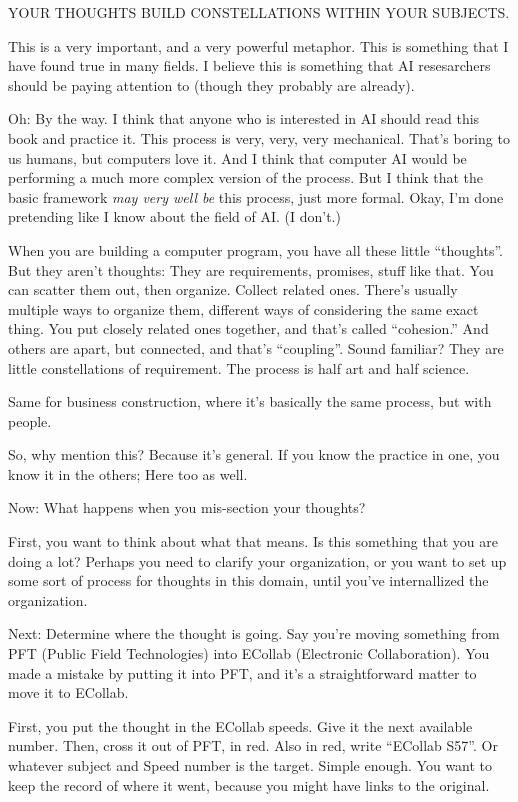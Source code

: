 \documentclass[oneside]{book}
\begin{document}
YOUR THOUGHTS BUILD CONSTELLATIONS WITHIN YOUR SUBJECTS.

This is a very important, and a very powerful metaphor. This is
something that I have found true in many fields. I believe this is
something that AI resesarchers should be paying attention to (though
they probably are already).

Oh: By the way. I think that anyone who is interested in AI should
read this book and practice it. This process is very, very, very
mechanical. That's boring to us humans, but computers love it. And I
think that computer AI would be performing a much more complex version
of the process. But I think that the basic framework \emph{may very well
be} this process, just more formal. Okay, I'm done pretending like I
know about the field of AI. (I don't.)

When you are building a computer program, you have all these little
``thoughts''. But they aren't thoughts: They are requirements, promises,
stuff like that. You can scatter them out, then organize. Collect
related ones. There's usually multiple ways to organize them,
different ways of considering the same exact thing. You put closely
related ones together, and that's called ``cohesion.'' And others are
apart, but connected, and that's ``coupling''. Sound familiar? They are
little constellations of requirement. The process is half art and half
science.

Same for business construction, where it's basically the same process,
but with people.

So, why mention this? Because it's general. If you know the practice
in one, you know it in the others; Here too as well.

Now: What happens when you mis-section your thoughts?

First, you want to think about what that means. Is this something that
you are doing a lot? Perhaps you need to clarify your organization, or
you want to set up some sort of process for thoughts in this domain,
until you've internallized the organization.

Next: Determine where the thought is going. Say you're moving
something from PFT (Public Field Technologies) into ECollab
(Electronic Collaboration). You made a mistake by putting it into PFT,
and it's a straightforward matter to move it to ECollab.

First, you put the thought in the ECollab speeds. Give it the next
available number. Then, cross it out of PFT, in red. Also in red,
write ``ECollab S57''. Or whatever subject and Speed number is the
target. Simple enough. You want to keep the record of where it went,
because you might have links to the original.
\end{document}
